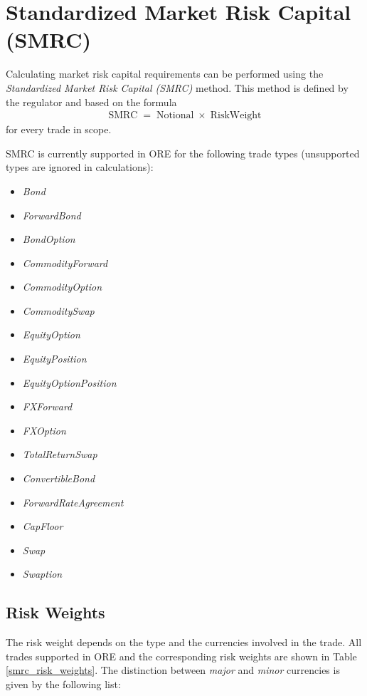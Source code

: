 \section{Standardized Market Risk Capital (SMRC)}

Calculating market risk capital requirements can be performed using the \emph{Standardized Market Risk Capital (SMRC)} method. This method is defined by the regulator and based on the formula
\begin{align}
	\operatorname{SMRC} = \operatorname{Notional} \times \operatorname{RiskWeight}
	\label{EqDefSMRC}
\end{align}
for every trade in scope. 

SMRC is currently supported in ORE for the following trade types (unsupported types
are ignored in calculations):
\begin{itemize}
\item \emph{Bond}
\item \emph{ForwardBond}
\item \emph{BondOption}
\item \emph{CommodityForward}
\item \emph{CommodityOption}
\item \emph{CommoditySwap}
\item \emph{EquityOption}
\item \emph{EquityPosition}
\item \emph{EquityOptionPosition}
\item \emph{FXForward}
\item \emph{FXOption}
\item \emph{TotalReturnSwap}
\item \emph{ConvertibleBond}
\item \emph{ForwardRateAgreement}
\item \emph{CapFloor}
\item \emph{Swap}
\item \emph{Swaption}
\end{itemize}

\subsection{Risk Weights}

The risk weight depends on the type and the currencies involved in the trade. All trades supported in ORE and the corresponding risk weights are shown in Table \ref{smrc_risk_weights}. The distinction between \emph{major} and \emph{minor} currencies is given by the following list:

